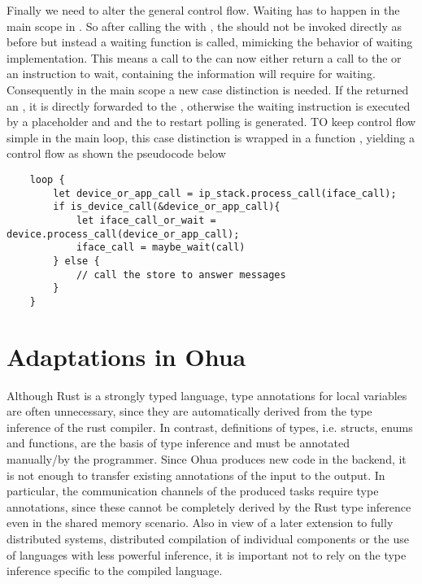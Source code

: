 Finally we need to alter the general control flow. Waiting has to happen in the main scope in \md. So after calling the \dev{} with , the \stack{} should not be invoked directly as before but instead a waiting function is called, mimicking the behavior of \md waiting implementation. This means a call to the \dev{} can now either return a call to the \stack{} or an instruction to wait, containing the information \md will require for waiting. Consequently in the main scope a new case distinction is needed. If the \dev{} returned an , it is directly forwarded to the \stack{}, otherwise the waiting instruction is executed by a placeholder and and the  to restart polling is generated. TO keep control flow simple in the main loop, this case distinction is wrapped in a function , yielding a control flow as shown the pseudocode below

\begin{verbatim}
    loop {
        let device_or_app_call = ip_stack.process_call(iface_call);
        if is_device_call(&device_or_app_call){
            let iface_call_or_wait = device.process_call(device_or_app_call);
            iface_call = maybe_wait(call)
        } else {
            // call the store to answer messages
        }
    }
\end{verbatim}

\section{Adaptations in Ohua}

Although Rust is a strongly typed language, type annotations for local variables are often unnecessary, since they are automatically derived from the type inference of the rust compiler. In contrast, definitions of types, i.e. structs, enums and functions, are the basis of type inference and must be annotated manually/by the programmer. Since Ohua produces new code in the backend, it is not enough to transfer existing annotations of the input to the output. In particular, the communication channels of the produced tasks require type annotations, since these cannot be completely derived by the Rust type inference even in the shared memory scenario. Also in view of a later extension to fully distributed systems, distributed compilation of individual components or the use of languages with less powerful inference, it is important not to rely on the type inference specific to the compiled language. 

